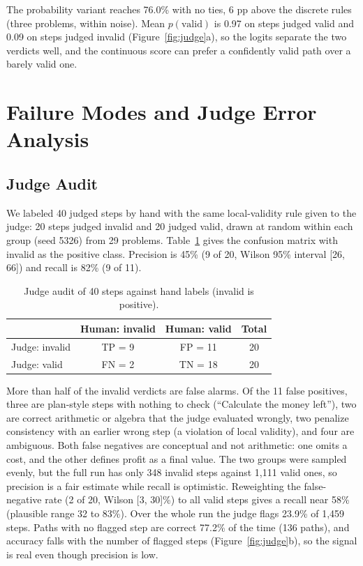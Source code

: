\documentclass{article}
\begin{document}
The probability variant reaches 76.0\% with no ties, 6 pp above the discrete rules (three problems, within noise). Mean $p(\mathrm{valid})$ is 0.97 on steps judged valid and 0.09 on steps judged invalid (Figure~\ref{fig:judge}a), so the logits separate the two verdicts well, and the continuous score can prefer a confidently valid path over a barely valid one.

\section{Failure Modes and Judge Error Analysis}
\subsection{Judge Audit}
We labeled 40 judged steps by hand with the same local-validity rule given to the judge: 20 steps judged invalid and 20 judged valid, drawn at random within each group (seed 5326) from 29 problems. Table~\ref{tab:audit} gives the confusion matrix with invalid as the positive class. Precision is 45\% (9 of 20, Wilson 95\% interval [26, 66]) and recall is 82\% (9 of 11).

\begin{table}[t]
\centering
\caption{Judge audit of 40 steps against hand labels (invalid is positive).}
\label{tab:audit}
\footnotesize
\begin{tabular}{lccc}
\toprule
 & Human: invalid & Human: valid & Total \\
\midrule
Judge: invalid & TP = 9 & FP = 11 & 20 \\
Judge: valid & FN = 2 & TN = 18 & 20 \\
\bottomrule
\end{tabular}
\end{table}

More than half of the invalid verdicts are false alarms. Of the 11 false positives, three are plan-style steps with nothing to check (``Calculate the money left''), two are correct arithmetic or algebra that the judge evaluated wrongly, two penalize consistency with an earlier wrong step (a violation of local validity), and four are ambiguous. Both false negatives are conceptual and not arithmetic: one omits a cost, and the other defines profit as a final value. The two groups were sampled evenly, but the full run has only 348 invalid steps against 1,111 valid ones, so precision is a fair estimate while recall is optimistic. Reweighting the false-negative rate (2 of 20, Wilson [3, 30]\%) to all valid steps gives a recall near 58\% (plausible range 32 to 83\%). Over the whole run the judge flags 23.9\% of 1,459 steps. Paths with no flagged step are correct 77.2\% of the time (136 paths), and accuracy falls with the number of flagged steps (Figure~\ref{fig:judge}b), so the signal is real even though precision is low.
\end{document}
